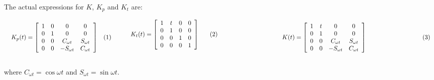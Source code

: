 		\indent The actual expressions for $K$, $K_p$ and $K_t$ are:\\
		\begin{subequations}
		\begin{minipage}{.5\linewidth}
		\begin{equation}
		  K_p(t) = \left[ \begin{array}{cccc}
			1 	& 0	& 0		& 0			\\
			0 	& 1	& 0  				& 0 		\\
			0 	& 0	& C_{\omega t}		& S_{\omega t}	\\
			0 	& 0	& - S_{\omega t}	& C_{\omega t}
		\end{array}\right]
		\label{eqCh2:Kp_exp}
		\end{equation}
		\end{minipage}
		\begin{minipage}{.5\linewidth}
		\begin{equation}
		 K_t(t) = \left[ \begin{array}{cccc}
			1 	& t	& 0	& 0	\\
			0 	& 1	& 0 & 0 	\\
			0 	& 0	& 1	& 0	\\
			0 	& 0	& 0	& 1
			\end{array}\right]
			\label{eqCh2:Kt_exp}
		\end{equation}
		\end{minipage}
		\begin{minipage}{\linewidth}
		\begin{center}
		\begin{equation}
		  K(t) = \left[ \begin{array}{cccc}
			1 	& t	& 0		& 0			\\
			0 	& 1	& 0  				& 0 		\\
			0 	& 0	& C_{\omega t}		& S_{\omega t}	\\
			0 	& 0	& - S_{\omega t}	& C_{\omega t}
		\end{array}\right]
		\label{eqCh2:K_exp}
		\end{equation}
		\end{center}
		\end{minipage}
		\end{subequations}\\
		\noindent where $C_{\omega t} = \cos\omega t$ and $S_{\omega t} = \sin\omega t$.
%
